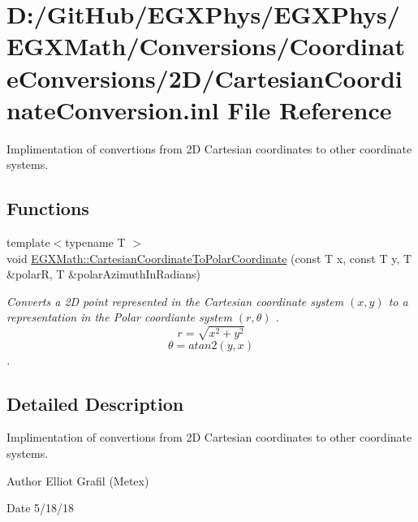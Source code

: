 \hypertarget{_cartesian_coordinate_conversion_8inl}{}\section{D\+:/\+Git\+Hub/\+E\+G\+X\+Phys/\+E\+G\+X\+Phys/\+E\+G\+X\+Math/\+Conversions/\+Coordinate\+Conversions/2\+D/\+Cartesian\+Coordinate\+Conversion.inl File Reference}
\label{_cartesian_coordinate_conversion_8inl}


Implimentation of convertions from 2D Cartesian coordinates to other coordinate systems.  


\subsection*{Functions}
\begin{DoxyCompactItemize}
\item 
{\footnotesize template$<$typename T $>$ }\\void \mbox{\hyperlink{group___e_g_x_math-_conversions-_coordinate_conversions-2_d-_cartesian_ga606ec2b97e0000d9b2a511c0e7b74bc9}{E\+G\+X\+Math\+::\+Cartesian\+Coordinate\+To\+Polar\+Coordinate}} (const T x, const T y, T \&polarR, T \&polar\+Azimuth\+In\+Radians)
\begin{DoxyCompactList}\small\item\em Converts a 2D point represented in the Cartesian coordinate system $(x,y)$ to a representation in the Polar coordiante system $(r,\theta)$ . \[ r = \sqrt{x^2+y^2} \] \[ \theta = atan2(y,x) \]. \end{DoxyCompactList}\end{DoxyCompactItemize}


\subsection{Detailed Description}
Implimentation of convertions from 2D Cartesian coordinates to other coordinate systems. 

\begin{DoxyAuthor}{Author}
Elliot Grafil (Metex) 
\end{DoxyAuthor}
\begin{DoxyDate}{Date}
5/18/18 
\end{DoxyDate}

